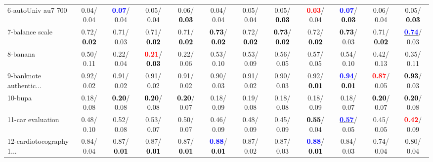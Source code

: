 \begin{table}[h]
\begin{center}
{\begin{tabular}{lc|c|c|c|c|c|c|c|c|c|c}
6-autoUniv au7 700 &   0.04/  0.04 & \textcolor{blue}{\textbf{  0.07}}/  0.04 &   0.05/  0.04 &   0.06/\textcolor{black}{\textbf{  0.03}} &   0.04/  0.04 &   0.05/  0.04 &   0.05/\textcolor{black}{\textbf{  0.03}} & \textcolor{red}{\textbf{  0.03}}/  0.04 & \textcolor{blue}{\textbf{  0.07}}/\textcolor{black}{\textbf{  0.03}} &   0.06/  0.04 &   0.05/\textcolor{black}{\textbf{  0.03}} \\
7-balance scale &   0.72/\textcolor{black}{\textbf{  0.02}} &   0.71/  0.03 &   0.71/\textcolor{black}{\textbf{  0.02}} &   0.71/\textcolor{black}{\textbf{  0.02}} & \textcolor{black}{\textbf{  0.73}}/\textcolor{black}{\textbf{  0.02}} &   0.72/\textcolor{black}{\textbf{  0.02}} & \textcolor{black}{\textbf{  0.73}}/\textcolor{black}{\textbf{  0.02}} &   0.72/\textcolor{black}{\textbf{  0.02}} & \textcolor{black}{\textbf{  0.73}}/  0.03 &   0.71/\textcolor{black}{\textbf{  0.02}} & \underline{\textcolor{blue}{\textbf{  0.74}}}/  0.03 \\ \hline
8-banana &   0.50/  0.11 &   0.22/  0.04 & \textcolor{red}{\textbf{  0.21}}/\textcolor{black}{\textbf{  0.03}} &   0.22/  0.06 &   0.53/  0.10 &   0.53/  0.09 &   0.56/  0.05 &   0.57/  0.05 &   0.54/  0.10 &   0.42/  0.13 &   0.35/  0.11 \\
9-banknote authentic... &   0.92/  0.02 &   0.91/  0.02 &   0.91/  0.02 &   0.91/  0.02 &   0.90/  0.03 &   0.91/  0.02 &   0.90/  0.03 &   0.92/\textcolor{black}{\textbf{  0.01}} & \underline{\textcolor{blue}{\textbf{  0.94}}}/\textcolor{black}{\textbf{  0.01}} & \textcolor{red}{\textbf{  0.87}}/  0.05 & \textcolor{black}{\textbf{  0.93}}/  0.03 \\
10-bupa &   0.18/  0.08 & \textcolor{black}{\textbf{  0.20}}/  0.08 & \textcolor{black}{\textbf{  0.20}}/  0.08 & \textcolor{black}{\textbf{  0.20}}/  0.07 &   0.18/  0.09 &   0.19/  0.08 &   0.18/  0.08 &   0.18/  0.09 &   0.18/  0.07 & \textcolor{black}{\textbf{  0.20}}/  0.07 & \textcolor{black}{\textbf{  0.20}}/  0.08 \\
11-car evaluation &   0.48/  0.10 &   0.52/  0.08 &   0.53/  0.07 &   0.50/  0.07 &   0.46/  0.09 &   0.48/  0.09 &   0.45/  0.09 & \textcolor{black}{\textbf{  0.55}}/  0.04 & \underline{\textcolor{blue}{\textbf{  0.57}}}/  0.05 &   0.45/  0.05 & \textcolor{red}{\textbf{  0.42}}/  0.09 \\
12-cardiotocography 1... &   0.84/  0.04 &   0.87/\textcolor{black}{\textbf{  0.01}} &   0.87/\textcolor{black}{\textbf{  0.01}} &   0.87/\textcolor{black}{\textbf{  0.01}} & \textcolor{blue}{\textbf{  0.88}}/\textcolor{black}{\textbf{  0.01}} &   0.87/  0.02 &   0.87/  0.03 & \textcolor{blue}{\textbf{  0.88}}/\textcolor{black}{\textbf{  0.01}} &   0.84/  0.03 &   0.74/  0.04 &   0.80/  0.04 \\

\end{tabular}}
\end{center}
\end{table}
